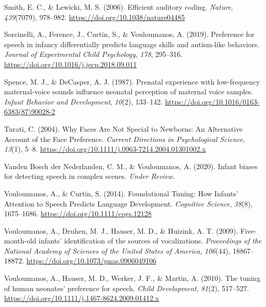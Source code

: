 \documentclass[
  english,
  man]{apa6}
\newlength{\cslhangindent}
\newlength{\cslentryspacingunit} %
\newenvironment{CSLReferences}[2] %
 {%
  \setlength{\parindent}{0pt}
  \ifodd #1
  \let\oldpar\par
  \def\par{\hangindent=\cslhangindent\oldpar}
  \fi
  \setlength{\parskip}{#2\cslentryspacingunit}
 }%
 {}
\begin{document}
\begin{CSLReferences}{1}{0}
\leavevmode{}%
Smith, E. C., \& Lewicki, M. S. (2006). Efficient auditory coding. \emph{Nature}, \emph{439}(7079), 978--982. \url{https://doi.org/10.1038/nature04485}

\leavevmode{}%
Sorcinelli, A., Ference, J., Curtin, S., \& Vouloumanos, A. (2019). Preference for speech in infancy differentially predicts language skills and autism-like behaviors. \emph{Journal of Experimental Child Psychology}, \emph{178}, 295--316. \url{https://doi.org/10.1016/j.jecp.2018.09.011}

\leavevmode{}%
Spence, M. J., \& DeCasper, A. J. (1987). Prenatal experience with low-frequency maternal-voice sounds influence neonatal perception of maternal voice samples. \emph{Infant Behavior and Development}, \emph{10}(2), 133--142. \url{https://doi.org/10.1016/0163-6383(87)90028-2}

\leavevmode{}%
Turati, C. (2004). Why {Faces} {Are} {Not} {Special} to {Newborns}: {An} {Alternative} {Account} of the {Face} {Preference}. \emph{Current Directions in Psychological Science}, \emph{13}(1), 5--8. \url{https://doi.org/10.1111/j.0963-7214.2004.01301002.x}

\leavevmode{}%
Vanden Bosch der Nederlanden, C. M., \& Vouloumanos, A. (2020). Infant biases for detecting speech in complex scenes. \emph{Under Review}.

\leavevmode{}%
Vouloumanos, A., \& Curtin, S. (2014). Foundational {Tuning}: {How} {Infants}' {Attention} to {Speech} {Predicts} {Language} {Development}. \emph{Cognitive Science}, \emph{38}(8), 1675--1686. \url{https://doi.org/10.1111/cogs.12128}

\leavevmode{}%
Vouloumanos, A., Druhen, M. J., Hauser, M. D., \& Huizink, A. T. (2009). Five-month-old infants' identification of the sources of vocalizations. \emph{Proceedings of the National Academy of Sciences of the United States of America}, \emph{106}(44), 18867--18872. \url{https://doi.org/10.1073/pnas.0906049106}

\leavevmode{}%
Vouloumanos, A., Hauser, M. D., Werker, J. F., \& Martin, A. (2010). The tuning of human neonates' preference for speech. \emph{Child Development}, \emph{81}(2), 517--527. \url{https://doi.org/10.1111/j.1467-8624.2009.01412.x}


\end{CSLReferences}
\end{document}
